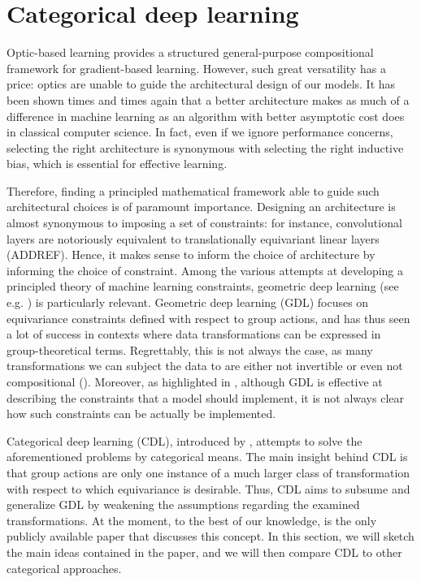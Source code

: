 \documentclass[12pt,a4paper,openright,twoside]{report}
\theoremstyle{plain}
\theoremstyle{definition}
\begin{document}
\section{Categorical deep learning}

Optic-based learning provides a structured general-purpose compositional framework for gradient-based learning. However, such great versatility has a price: optics are unable to guide the architectural design of our models. It has been shown times and times again that a better architecture makes as much of a difference in machine learning as an algorithm with better asymptotic cost does in classical computer science. In fact, even if we ignore performance concerns, selecting the right architecture is synonymous with selecting the right inductive bias, which is essential for effective learning.

Therefore, finding a principled mathematical framework able to guide such architectural choices is of paramount importance. Designing an architecture is almost synonymous to imposing a set of constraints: for instance, convolutional layers are notoriously equivalent to translationally equivariant linear layers (ADDREF).
Hence, it makes sense to inform the choice of architecture by informing the choice of constraint. Among the various attempts at developing a principled theory of machine learning constraints, geometric deep learning (see e.g. \cite{bronstein2021geometric}) is particularly relevant.
Geometric deep learning (GDL) focuses on equivariance constraints defined with respect to group actions, and has thus seen a lot of success in contexts where data transformations can be expressed in group-theoretical terms. Regrettably, this is not always the case, as many transformations we can subject the data to are either not invertible or even not compositional (\cite{gavranovicposition}). Moreover, as highlighted in \cite{gavranovicposition}, although GDL is effective at describing the constraints that a model should implement, it is not always clear how such constraints can be actually be implemented.  


Categorical deep learning (CDL), introduced by \cite{gavranovicposition}, attempts to solve the aforementioned problems by categorical means.
The main insight behind CDL is that group actions are only one instance of a much larger class of transformation with respect to which equivariance is desirable. Thus, CDL aims to subsume and generalize GDL by weakening the assumptions regarding the examined transformations. At the moment, to the best of our knowledge,  \cite{gavranovicposition} is the only publicly available paper that discusses this concept. In this section, we will sketch the main ideas contained in the paper, and we will then compare CDL to other categorical approaches.
\end{document}
